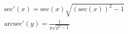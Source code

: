 \begin{multline*}
  \mathrm{sec}'(x)=\mathrm{sec}(x)\sqrt{(\mathrm{sec}(x))^2-1} \\ \mathrm{arcsec}'(y)=\frac{1}{y\sqrt{y^2-1}}
\end{multline*}
